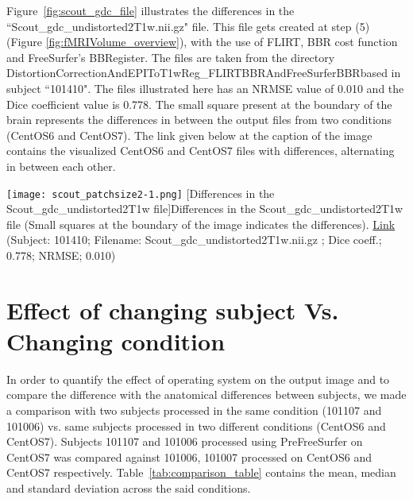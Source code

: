 Figure~\ref{fig:scout_gdc_file} illustrates the differences in the ``Scout\_gdc\_undistorted2T1w.nii.gz" file. This file gets created at step (5) (Figure \ref{fig:fMRIVolume_overview}), with the use of FLIRT, BBR cost function and FreeSurfer's BBRegister. The files are taken from the directory DistortionCorrectionAndEPIToT1wReg\_FLIRTBBRAndFreeSurferBBRbased in subject ``101410". The files illustrated here has an NRMSE value of 0.010 and the Dice coefficient value is 0.778. The small square present at the boundary of the brain represents the differences in between the output files from two conditions (CentOS6 and CentOS7). The link given below at the caption of the image contains the visualized CentOS6 and CentOS7 files with differences, alternating in between each other.

\begin{center}
\texttt{[image: scout\_patchsize2-1.png]}%
[Differences in the Scout\_gdc\_undistorted2T1w file]{Differences in the Scout\_gdc\_undistorted2T1w file (Small squares at the boundary of the image indicates the differences). \href{https://drive.google.com/file/d/1iRP6jVMKbGBLjLdEi3l5j4Q8Pngp5Nln/view?usp=sharing}{Link}\\(Subject: 101410; Filename: Scout\_gdc\_undistorted2T1w.nii.gz ; Dice coeff.; 0.778; NRMSE; 0.010)}
\label{fig:scout_gdc_file}
\end{center}

\section{Effect of changing subject Vs. Changing condition}\label{sec:comparison}
In order to quantify the effect of operating system on the output image and to compare the difference with the anatomical differences between subjects, we made a comparison with two subjects processed in the same condition (101107 and 101006) vs. same subjects processed in two different conditions (CentOS6 and CentOS7). Subjects 101107 and 101006 processed using PreFreeSurfer on CentOS7 was compared against 101006, 101007 processed on CentOS6 and CentOS7 respectively. Table~\ref{tab:comparison_table} contains the mean, median and standard deviation across the said conditions.

